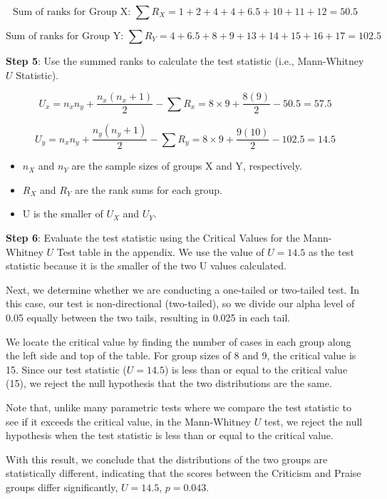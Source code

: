 \documentclass[
  letterpaper,
  DIV=11,
  numbers=noendperiod]{scrreprt}
\providecommand{\tightlist}{%
  \setlength{\itemsep}{0pt}\setlength{\parskip}{0pt}}
\begin{document}
\[
\text{Sum of ranks for Group X: } 
\sum R_X = 1 +2+4+4+6.5+10+11+12=50.5
\]

\[
\text{Sum of ranks for Group Y: }
\sum R_Y=4+6.5+8+9+13+14+15+16+17=102.5
\]

\textbf{Step 5}: Use the summed ranks to calculate the test statistic
(i.e., Mann-Whitney \(U\) Statistic).

\[
U_x = n_x n_y + \frac{n_x(n_x + 1)}{2} - \sum R_x
= 8 \times 9 + \frac{8(9)}{2} - 50.5
= 57.5
\]

\[
U_y = n_x n_y + \frac{n_y(n_y + 1)}{2} - \sum R_y
= 8 \times 9 + \frac{9(10)}{2} - 102.5
= 14.5
\]

\begin{itemize}
\tightlist
\item
  \(n_X\) and \(n_Y\) are the sample sizes of groups X and Y,
  respectively.
\item
  \(R_X\) and \(R_Y\) are the rank sums for each group.
\item
  U is the smaller of \(U_X\) and \(U_Y\).
\end{itemize}

\textbf{Step 6}: Evaluate the test statistic using the Critical Values
for the Mann-Whitney \(U\) Test table in the appendix. We use the value
of \(U = 14.5\) as the test statistic because it is the smaller of the
two U values calculated.

Next, we determine whether we are conducting a one-tailed or two-tailed
test. In this case, our test is non-directional (two-tailed), so we
divide our alpha level of 0.05 equally between the two tails, resulting
in 0.025 in each tail.

We locate the critical value by finding the number of cases in each
group along the left side and top of the table. For group sizes of 8 and
9, the critical value is 15. Since our test statistic (\(U = 14.5\)) is
less than or equal to the critical value (15), we reject the null
hypothesis that the two distributions are the same.

Note that, unlike many parametric tests where we compare the test
statistic to see if it exceeds the critical value, in the Mann-Whitney
\(U\) test, we reject the null hypothesis when the test statistic is
less than or equal to the critical value.

With this result, we conclude that the distributions of the two groups
are statistically different, indicating that the scores between the
Criticism and Praise groups differ significantly, \(U = 14.5\),
\(p = 0.043\).
\end{document}
